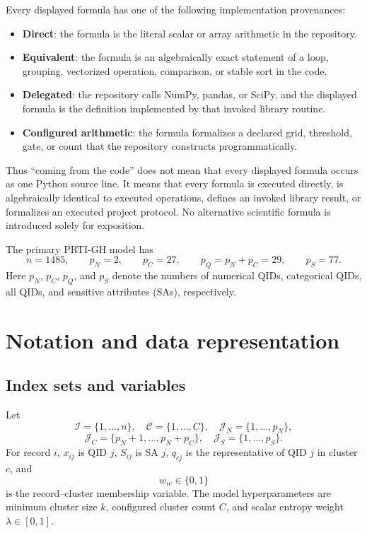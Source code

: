 \documentclass[11pt,a4paper]{article}
\begin{document}
Every displayed formula has one of the following implementation provenances:
\begin{itemize}
  \item \textbf{Direct}: the formula is the literal scalar or array arithmetic in
  the repository.
  \item \textbf{Equivalent}: the formula is an algebraically exact statement of
  a loop, grouping, vectorized operation, comparison, or stable sort in the code.
  \item \textbf{Delegated}: the repository calls NumPy, pandas, or SciPy, and the
  displayed formula is the definition implemented by that invoked library routine.
  \item \textbf{Configured arithmetic}: the formula formalizes a declared grid,
  threshold, gate, or count that the repository constructs programmatically.
\end{itemize}
Thus ``coming from the code'' does not mean that every displayed formula occurs as
one Python source line.  It means that every formula is executed directly, is
algebraically identical to executed operations, defines an invoked library result,
or formalizes an executed project protocol.  No alternative scientific formula is
introduced solely for exposition.

The primary PRTI-GH model has
\[
n=1485,\qquad p_N=2,\qquad p_C=27,\qquad p_Q=p_N+p_C=29,
\qquad p_S=77.
\]
Here $p_N$, $p_C$, $p_Q$, and $p_S$ denote the numbers of numerical QIDs,
categorical QIDs, all QIDs, and sensitive attributes (SAs), respectively.

\section{Notation and data representation}

\subsection{Index sets and variables}

Let
\[
\mathcal I=\{1,\ldots,n\},\quad
\mathcal C=\{1,\ldots,C\},\quad
\mathcal J_N=\{1,\ldots,p_N\},
\]
\[
\mathcal J_C=\{p_N+1,\ldots,p_N+p_C\},\quad
\mathcal J_S=\{1,\ldots,p_S\}.
\]
For record $i$, $x_{ij}$ is QID $j$, $S_{ij}$ is SA $j$, $q_{cj}$ is the
representative of QID $j$ in cluster $c$, and
\[
w_{ic}\in\{0,1\}
\]
is the record--cluster membership variable.  The model hyperparameters are
minimum cluster size $k$, configured cluster count $C$, and scalar entropy
weight $\lambda\in[0,1]$.
\end{document}
